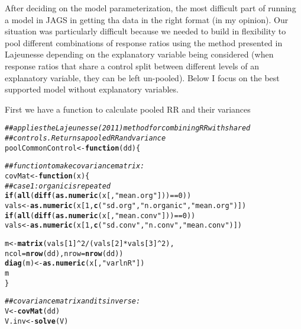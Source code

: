 \documentclass{article}\usepackage[]{graphicx}\usepackage[]{color}
\makeatletter
\newcommand{\hlnum}[1]{\textcolor[rgb]{0.686,0.059,0.569}{#1}}%
\newcommand{\hlstr}[1]{\textcolor[rgb]{0.192,0.494,0.8}{#1}}%
\newcommand{\hlcom}[1]{\textcolor[rgb]{0.678,0.584,0.686}{\textit{#1}}}%
\newcommand{\hlopt}[1]{\textcolor[rgb]{0,0,0}{#1}}%
\newcommand{\hlstd}[1]{\textcolor[rgb]{0.345,0.345,0.345}{#1}}%
\newcommand{\hlkwa}[1]{\textcolor[rgb]{0.161,0.373,0.58}{\textbf{#1}}}%
\newcommand{\hlkwb}[1]{\textcolor[rgb]{0.69,0.353,0.396}{#1}}%
\newcommand{\hlkwc}[1]{\textcolor[rgb]{0.333,0.667,0.333}{#1}}%
\newcommand{\hlkwd}[1]{\textcolor[rgb]{0.737,0.353,0.396}{\textbf{#1}}}%
\newenvironment{kframe}{%
 \def\at@end@of@kframe{}%
 \ifinner\ifhmode%
  \def\at@end@of@kframe{\end{minipage}}%
  \begin{minipage}{\columnwidth}%
 \fi\fi%
 \def\FrameCommand##1{\hskip\@totalleftmargin \hskip-\fboxsep
 \colorbox{shadecolor}{##1}\hskip-\fboxsep
     \hskip-\linewidth \hskip-\@totalleftmargin \hskip\columnwidth}%
 \MakeFramed {\advance\hsize-\width
   \@totalleftmargin\z@ \linewidth\hsize
   \@setminipage}}%
 {\par\unskip\endMakeFramed%
 \at@end@of@kframe}
\newenvironment{knitrout}{}{} %
\makeatother
\begin{document}
After deciding on the model parameterization, the most difficult part
of running a model in JAGS in getting tha data in the right format (in
my opinion). Our situation was particularly difficult because we
needed to build in flexibility to pool different combinations of
response ratios using the method presented in Lajeunesse
\cite{Lajeunesse2011} depending on the explanatory variable being
considered (when response ratios that share a control split between
different levels of an explanatory variable, they can be left
un-pooled). Below I focus on the best supported model without
explanatory variables.

First we have a function to calculate pooled RR and their variances
\begin{knitrout}
\color{fgcolor}\begin{kframe}
\begin{alltt}
\hlcom{## applies the Lajeunesse (2011) method for combining RR with shared}
\hlcom{## controls. Returns a pooled RR and variance}
\hlstd{poolCommonControl} \hlkwb{<-} \hlkwa{function}\hlstd{(}\hlkwc{dd}\hlstd{) \{}

  \hlcom{## function to make covariance matrix:}
  \hlstd{covMat} \hlkwb{<-} \hlkwa{function}\hlstd{(}\hlkwc{x}\hlstd{)\{}
    \hlcom{## case 1: organic is repeated}
    \hlkwa{if}\hlstd{(}\hlkwd{all}\hlstd{(}\hlkwd{diff}\hlstd{(}\hlkwd{as.numeric}\hlstd{(x[,}\hlstr{"mean.org"}\hlstd{]))}\hlopt{==}\hlnum{0}\hlstd{))}
      \hlstd{vals} \hlkwb{<-} \hlkwd{as.numeric}\hlstd{(x[}\hlnum{1}\hlstd{,} \hlkwd{c}\hlstd{(}\hlstr{"sd.org"}\hlstd{,} \hlstr{"n.organic"}\hlstd{,} \hlstr{"mean.org"}\hlstd{)])}
    \hlkwa{if}\hlstd{(}\hlkwd{all}\hlstd{(}\hlkwd{diff}\hlstd{(}\hlkwd{as.numeric}\hlstd{(x[,}\hlstr{"mean.conv"}\hlstd{]))}\hlopt{==}\hlnum{0}\hlstd{))}
      \hlstd{vals} \hlkwb{<-} \hlkwd{as.numeric}\hlstd{(x[}\hlnum{1}\hlstd{,} \hlkwd{c}\hlstd{(}\hlstr{"sd.conv"}\hlstd{,} \hlstr{"n.conv"}\hlstd{,} \hlstr{"mean.conv"}\hlstd{)])}

    \hlstd{m} \hlkwb{<-} \hlkwd{matrix}\hlstd{(vals[}\hlnum{1}\hlstd{]}\hlopt{^}\hlnum{2}\hlopt{/}\hlstd{(vals[}\hlnum{2}\hlstd{]}\hlopt{*}\hlstd{vals[}\hlnum{3}\hlstd{]}\hlopt{^}\hlnum{2}\hlstd{),}
                \hlkwc{ncol}\hlstd{=}\hlkwd{nrow}\hlstd{(dd),} \hlkwc{nrow}\hlstd{=}\hlkwd{nrow}\hlstd{(dd))}
    \hlkwd{diag}\hlstd{(m)} \hlkwb{<-} \hlkwd{as.numeric}\hlstd{(x[,}\hlstr{"varlnR"}\hlstd{])}
    \hlstd{m}
  \hlstd{\}}

  \hlcom{## covariance matrix and its inverse:}
  \hlstd{V} \hlkwb{<-} \hlkwd{covMat}\hlstd{(dd)}
  \hlstd{V.inv} \hlkwb{<-} \hlkwd{solve}\hlstd{(V)}


\end{alltt}
\end{kframe}
\end{knitrout}
\end{document}
